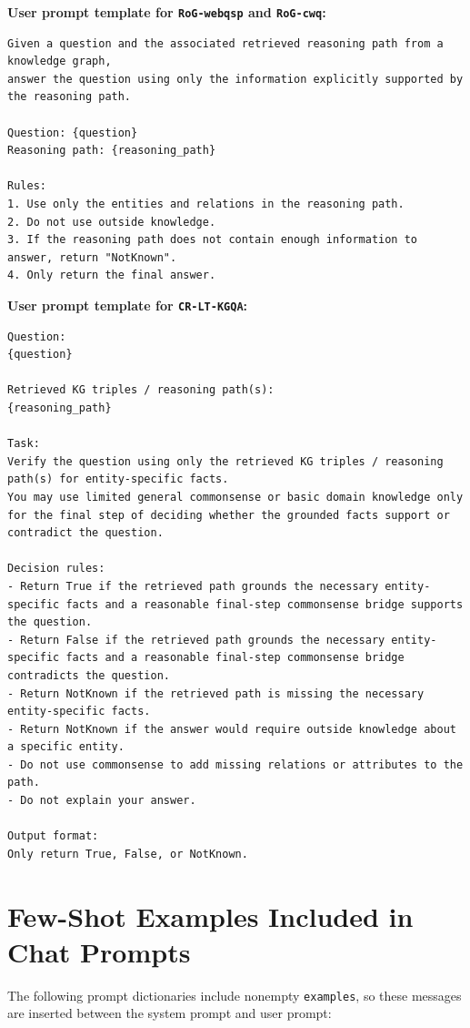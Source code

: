 \documentclass[11pt]{article}
\begin{document}
\textbf{User prompt template for \texttt{RoG-webqsp} and \texttt{RoG-cwq}:}
\begin{lstlisting}[style=prompt]
Given a question and the associated retrieved reasoning path from a knowledge graph,
answer the question using only the information explicitly supported by the reasoning path.

Question: {question}
Reasoning path: {reasoning_path}

Rules:
1. Use only the entities and relations in the reasoning path.
2. Do not use outside knowledge.
3. If the reasoning path does not contain enough information to answer, return "NotKnown".
4. Only return the final answer.
\end{lstlisting}

\textbf{User prompt template for \texttt{CR-LT-KGQA}:}
\begin{lstlisting}[style=prompt]
Question:
{question}

Retrieved KG triples / reasoning path(s):
{reasoning_path}

Task:
Verify the question using only the retrieved KG triples / reasoning path(s) for entity-specific facts. 
You may use limited general commonsense or basic domain knowledge only for the final step of deciding whether the grounded facts support or contradict the question.

Decision rules:
- Return True if the retrieved path grounds the necessary entity-specific facts and a reasonable final-step commonsense bridge supports the question.
- Return False if the retrieved path grounds the necessary entity-specific facts and a reasonable final-step commonsense bridge contradicts the question.
- Return NotKnown if the retrieved path is missing the necessary entity-specific facts.
- Return NotKnown if the answer would require outside knowledge about a specific entity.
- Do not use commonsense to add missing relations or attributes to the path.
- Do not explain your answer.

Output format:
Only return True, False, or NotKnown.
\end{lstlisting}

\section{Few-Shot Examples Included in Chat Prompts}

The following prompt dictionaries include nonempty \texttt{examples}, so these
messages are inserted between the system prompt and user prompt:
\end{document}
